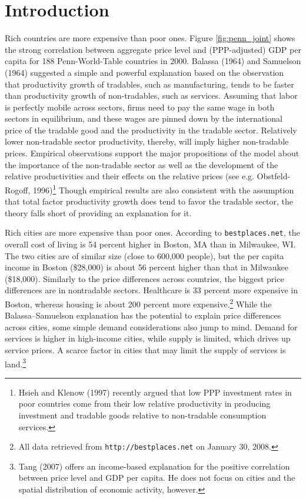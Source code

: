 \documentclass[12pt]{article}
\begin{document}
\section{Introduction}
Rich countries are more expensive than poor ones. Figure \ref{fig:penn_joint} shows
the strong correlation between aggregate price level and (PPP-adjusted) GDP per capita for 188 Penn-World-Table countries in 2000. Balassa (1964) and Samuelson
(1964) suggested a simple and powerful explanation based on the
observation that productivity growth of tradables, such as manufacturing,
tends to be faster than productivity growth of non-tradables, such as
services. Assuming that labor is perfectly mobile across sectors,
firms need to pay the same wage in both sectors in equilibrium, and
these wages are pinned down by the international price of the
tradable good and the productivity in the tradable sector.
Relatively lower non-tradable sector productivity, thereby, will
imply higher non-tradable prices. Empirical observations support the
major propositions of the model about the importance of the
non-tradable sector as well as the development of the relative
productivities and their effects on the relative prices (see e.g.
Obstfeld-Rogoff, 1996)\footnote{Hsieh and Klenow (1997) recently
argued that low PPP investment rates in poor countries come from
their low relative productivity in producing investment and tradable
goods relative to non-tradable consumption services.} Though
empirical results are also consistent with the assumption that total factor
productivity growth does tend to favor the tradable sector, the
theory falls short of providing an explanation for it.

Rich cities are more expensive than poor ones. According to \texttt{bestplaces.net}, the overall cost of living is 54 percent higher in Boston, MA than in Milwaukee, WI. The two cities are of similar size (close to 600,000 people), but the per capita income in Boston (\$28,000) is about 56 percent higher than that in Milwaukee (\$18,000). Similarly to the price differences across countries, the biggest price differences are in nontradable sectors. Healthcare is 33 percent more expensive in Boston, whereas housing is about 200 percent more expensive.\footnote{All data retrieved from \texttt{http://bestplaces.net} on January 30, 2008.} While the Balassa--Samuelson explanation has the potential to explain price differences across cities, some simple demand considerations also jump to mind. Demand for services is higher in high-income cities, while supply is limited, which drives up service prices. A scarce factor in cities that may limit the supply of services is land.\footnote{Tang (2007) offers an income-based explanation for the positive correlation between price level and GDP per capita. He does not focus on cities and the spatial distribution of economic activity, however.}
\end{document}
